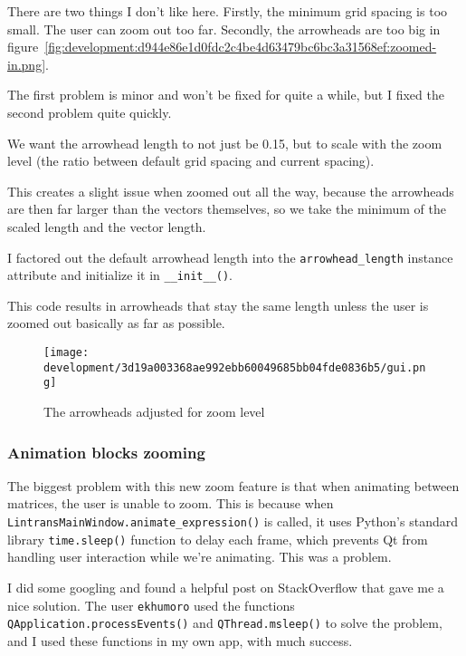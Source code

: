 \documentclass[../development.tex]{subfiles}
\begin{document}
There are two things I don't like here. Firstly, the minimum grid spacing is too small. The user can zoom out too far. Secondly, the arrowheads are too big in figure~\ref{fig:development:d944e86e1d0fdc2c4be4d63479bc6bc3a31568ef:zoomed-in.png}.

The first problem is minor and won't be fixed for quite a while, but I fixed the second problem quite quickly.

We want the arrowhead length to not just be 0.15, but to scale with the zoom level (the ratio between default grid spacing and current spacing).

This creates a slight issue when zoomed out all the way, because the arrowheads are then far larger than the vectors themselves, so we take the minimum of the scaled length and the vector length.

I factored out the default arrowhead length into the \texttt{arrowhead_length} instance attribute and initialize it in \texttt{__init__()}.


This code results in arrowheads that stay the same length unless the user is zoomed out basically as far as possible.

\begin{figure}[H]
	\centering
	\texttt{[image: development/3d19a003368ae992ebb60049685bb04fde0836b5/gui.png]}
	\caption{The arrowheads adjusted for zoom level}
	\label{fig:development:3d19a003368ae992ebb60049685bb04fde0836b5:gui.png}
\end{figure}

\subsubsection{Animation blocks zooming\label{development:improving-the-gui:animation-blocks-zooming}}

The biggest problem with this new zoom feature is that when animating between matrices, the user is unable to zoom. This is because when \texttt{LintransMainWindow.animate_expression()} is called, it uses Python's standard library \texttt{time.sleep()} function to delay each frame, which prevents Qt from handling user interaction while we're animating. This was a problem.

I did some googling and found a helpful post on StackOverflow\cite{so-update-window-in-pyqt5} that gave me a nice solution. The user \texttt{ekhumoro} used the functions \texttt{QApplication.processEvents()} and \texttt{QThread.msleep()} to solve the problem, and I used these functions in my own app, with much success.
\end{document}
